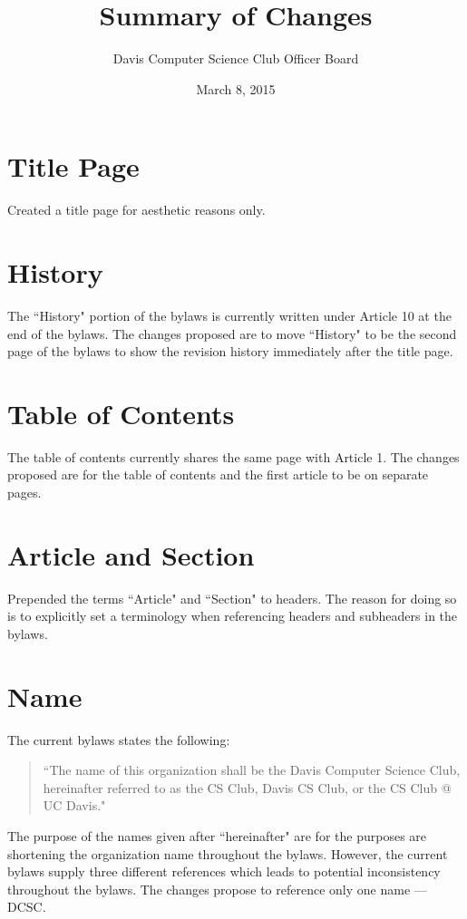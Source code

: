 \documentclass[11pt]{article}
\title{Summary of Changes}
\date{March 8, 2015}
\author{Davis Computer Science Club Officer Board}
\begin{document}
	
\maketitle
	
\section{Title Page}

Created a title page for aesthetic reasons only.

\section{History}

The ``History" portion of the bylaws is currently written under Article 10 at the end of the bylaws. The changes proposed are to move ``History" to be the second page of the bylaws to show the revision history immediately after the title page.

\section{Table of Contents}

The table of contents currently shares the same page with Article 1. The changes proposed are for the table of contents and the first article to be on separate pages.
	
\section{Article and Section}

Prepended the terms ``Article" and ``Section" to headers. The reason for doing so is to explicitly set a terminology when referencing headers and subheaders in the bylaws.

\section{Name}

The current bylaws states the following: 

\begin{quote}
``The name of this organization shall be the Davis Computer Science Club, hereinafter referred to as the CS Club, Davis CS Club, or the CS Club @ UC Davis."
\end{quote}

\noindent The purpose of the names given after ``hereinafter" are for the purposes are shortening the organization name throughout the bylaws. However, the current bylaws supply three different references which leads to potential inconsistency throughout the bylaws. The changes propose to reference only one name --- DCSC.\\
\end{document}
